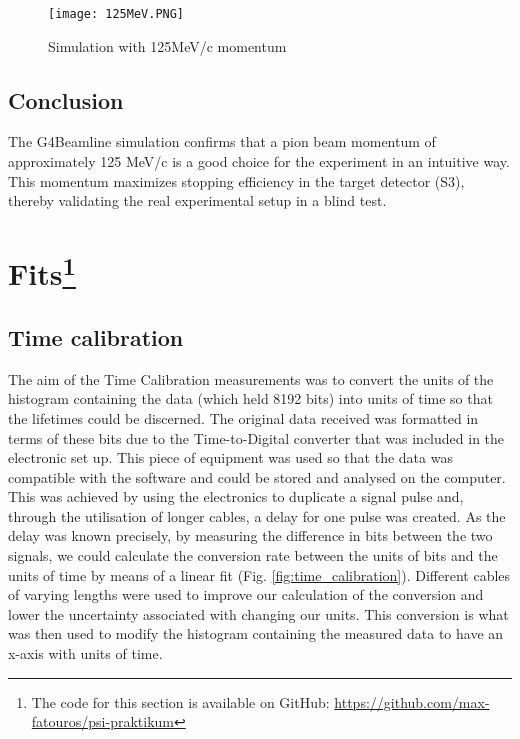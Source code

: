 \documentclass[11pt,a4paper]{article}
\begin{document}
\begin{figure}[h]
\centering
\texttt{[image: 125MeV.PNG]}
\caption{Simulation with 125MeV/c momentum}
\label{STOPscope}
\end{figure}

\subsection{Conclusion}
The G4Beamline simulation confirms that a pion beam momentum of approximately 125 MeV/c is a good choice for the experiment in an intuitive way. This momentum maximizes stopping efficiency in the target detector (S3), thereby validating the real experimental setup in a blind test. 



\section{Fits\protect\footnote{The code for this section is available on GitHub: \url{https://github.com/max-fatouros/psi-praktikum}}}
\subsection{Time calibration}
The aim of the Time Calibration measurements was to convert the units of the histogram containing the data (which held 8192 bits) into units of time so that the lifetimes could be discerned. The original data received was formatted in terms of these bits due to the Time-to-Digital converter that was included in the electronic set up. This piece of equipment was used so that the data was compatible with the software and could be stored and analysed on the computer. This was achieved by using the electronics to duplicate a signal pulse and, through the utilisation of longer cables, a delay for one pulse was created. As the delay was known precisely, by measuring the difference in bits between the two signals, we could calculate the conversion rate between the units of bits and the units of time by means of a linear fit (Fig. \ref{fig:time_calibration}). Different cables of varying lengths were used to improve our calculation of the conversion and lower the uncertainty associated with changing our units. This conversion is what was then used to modify the histogram containing the measured data to have an x-axis with units of time.
\end{document}
